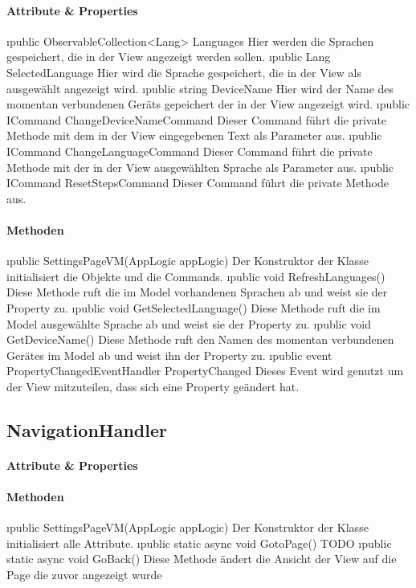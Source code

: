 \documentclass[../entwurf.tex]{subfiles}
\begin{document}
\paragraph{Attribute \& Properties}
\begin{itemize} 
	\i{public ObservableCollection<Lang> Languages} Hier werden die Sprachen gespeichert, die in der View angezeigt werden sollen.
	\i{public Lang SelectedLanguage} Hier wird die Sprache gespeichert, die in der View als ausgewählt angezeigt wird.
	\i{public string DeviceName} Hier wird der Name des momentan verbundenen Geräts gepeichert der in der View angezeigt wird.
	\i{public ICommand ChangeDeviceNameCommand} Dieser Command führt die private Methode  mit dem in der View eingegebenen Text als Parameter aus.
	\i{public ICommand ChangeLanguageCommand} Dieser Command führt die private Methode  mit der in der View ausgewählten Sprache als Parameter aus.
	\i{public ICommand ResetStepsCommand} Dieser Command führt die private Methode  aus.
\end{itemize}
\paragraph{Methoden}
\begin{itemize}
	\i{public SettingsPageVM(AppLogic appLogic)} Der Konstruktor der Klasse initialisiert die Objekte  und die Commands.
	\i{public void RefreshLanguages()} Diese Methode ruft die im Model vorhandenen Sprachen ab und weist sie der Property  zu.
	\i{public void GetSelectedLanguage()} Diese Methode ruft die im Model ausgewählte Sprache ab und weist sie der Property  zu.
	\i{public void GetDeviceName()} Diese Methode ruft den Namen des momentan verbundenen Gerätes im Model ab und weist ihn der Property  zu.
	\i{public event PropertyChangedEventHandler PropertyChanged} Dieses Event wird genutzt um der View mitzuteilen, dass sich eine Property geändert hat.
\end{itemize}
\subsection{NavigationHandler}
\paragraph{Attribute \& Properties}
\paragraph{Methoden}
\begin{itemize}
	\i{public SettingsPageVM(AppLogic appLogic)} Der Konstruktor der Klasse initialisiert alle Attribute.
	\i{public static async void GotoPage()} TODO
	\i{public static async void GoBack()} Diese Methode ändert die Ansicht der View auf die Page die zuvor angezeigt wurde
\end{itemize}

\end{document}
